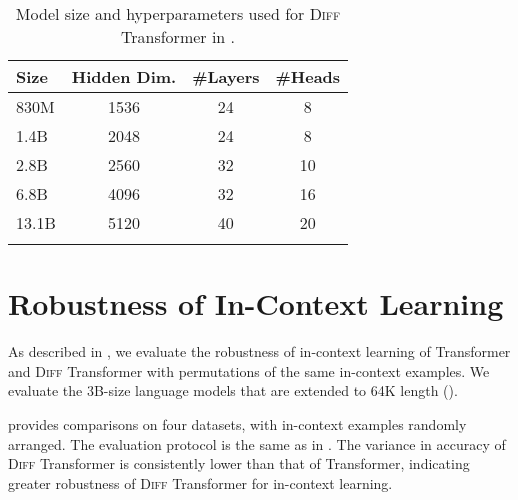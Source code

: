 \documentclass{article}
\newcommand\diff{\textsc{Diff} Transformer}
\begin{document}
\begin{table}[h]
\centering
\begin{tabular}{lccc}
\toprule
\bf Size & \bf Hidden Dim. & \bf \#Layers & \bf \#Heads \\
\midrule
830M & 1536 & 24 & 8 \\
1.4B & 2048 & 24 & 8 \\
2.8B & 2560 & 32 & 10 \\
6.8B & 4096 & 32 & 16 \\
13.1B & 5120 & 40 & 20 \\
\bottomrule
\\
\end{tabular}
\caption{Model size and hyperparameters used for \diff{} in .}
\label{tbl:hp:scaling}
\end{table}



\newpage
\section{Robustness of In-Context Learning}
\label{app:icl_rb}

As described in , we evaluate the robustness of in-context learning of Transformer and \diff{} with permutations of the same in-context examples.
We evaluate the 3B-size language models that are extended to 64K length ().

 provides comparisons on four datasets, with in-context examples randomly arranged.
The evaluation protocol is the same as in .
The variance in accuracy of \diff{} is consistently lower than that of Transformer, indicating greater robustness of \diff{} for in-context learning.
\end{document}
